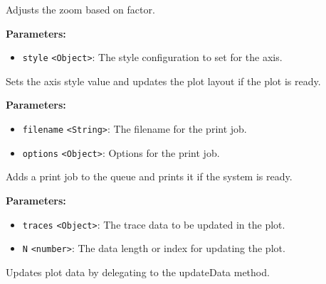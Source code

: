 \documentclass[12pt,a4paper]{article}
\begin{document}
\noindent Adjusts the zoom based on factor.

\vspace{5mm}
\noindent {}


\noindent \textbf{Parameters:}
\begin{itemize}
  \item \texttt{style} \texttt{<Object>}: The style configuration to set for the axis.
\end{itemize}

\noindent Sets the axis style value and updates the plot layout if the plot is ready.

\vspace{5mm}
\noindent {}


\noindent \textbf{Parameters:}
\begin{itemize}
  \item \texttt{filename} \texttt{<String>}: The filename for the print job.
  \item \texttt{options} \texttt{<Object>}: Options for the print job.
\end{itemize}

\noindent Adds a print job to the queue and prints it if the system is ready.

\vspace{5mm}
\noindent {}


\noindent \textbf{Parameters:}
\begin{itemize}
  \item \texttt{traces} \texttt{<Object>}: The trace data to be updated in the plot.
  \item \texttt{N} \texttt{<number>}: The data length or index for updating the plot.
\end{itemize}

\noindent Updates plot data by delegating to the \textasciigrave{}updateData\textasciigrave{} method.

\vspace{5mm}
\noindent {}
\end{document}
